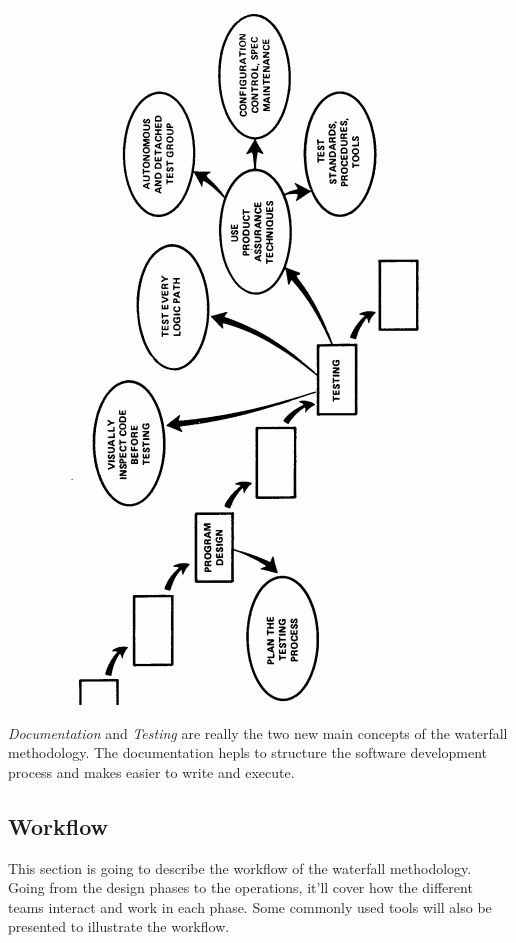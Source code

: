\begin{figure}
    \includegraphics{../../images/waterfall/figure_3}
    \centering
\end{figure}

\textit{Documentation} and \textit{Testing} are really the two new main
concepts of the waterfall methodology.
The documentation hepls to structure the software development process and
makes easier to write and execute.

\subsection{Workflow}\label{subsec:workflow}

This section is going to describe the workflow of the waterfall methodology.
Going from the design phases to the operations, it'll cover how the
different teams interact and work in each phase.
Some commonly used tools will also be presented to illustrate the workflow.

